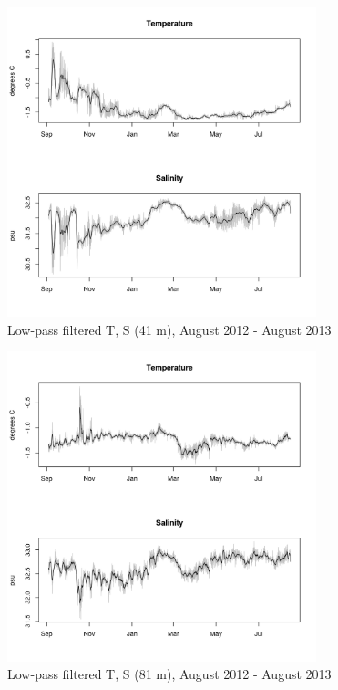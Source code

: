 \documentclass[12pt]{dforeport}
\begin{document}
\begin{figure}  
\centering
\includegraphics[width = 0.8\textwidth]{./figures/22_lpf_TS_41m_2012_2013.png}
\caption[Low-pass filtered T, S (41 m), 2012-2013]{Low-pass filtered T, S (41 m), August 2012 - August 2013}
\label{f:ctd_41_lpf_2012_2013}
\end{figure}

\begin{figure}  
\centering
\includegraphics[width = 0.8\textwidth]{./figures/23_lpf_TS_81m_2012_2013.png}
\caption[Low-pass filtered T, S (81 m), 2012-2013]{Low-pass filtered T, S (81 m), August 2012 - August 2013}
\label{f:ctd_81_lpf_2012_2013}
\end{figure}
\end{document}
